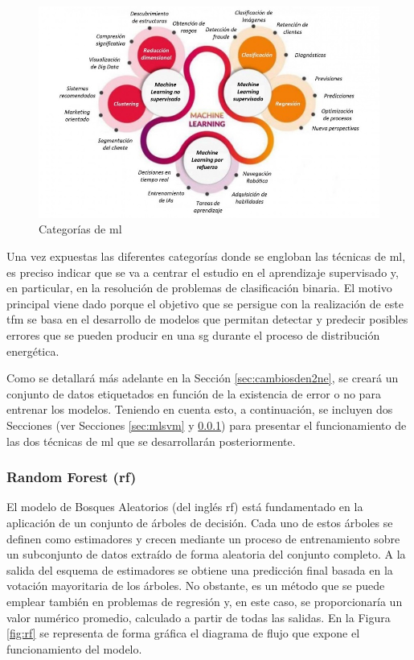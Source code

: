 \begin{figure}[h!]
    \centering
    \includegraphics[width=1\textwidth]{img/teoria/ml.jpeg}
    \caption{Categorías de \acrshort{ml} \cite{metal}}
    \label{fig:ml}
\end{figure}

\vspace{3mm}

Una vez expuestas las diferentes categorías donde se engloban las técnicas de \gls{ml}, es preciso indicar que se va a centrar el estudio en el aprendizaje supervisado y, en particular, en la resolución de problemas de clasificación binaria. El motivo principal viene dado porque el objetivo que se persigue con la realización de este \gls{tfm} se basa en el desarrollo de modelos que permitan detectar y predecir posibles errores que se pueden producir en una \gls{sg} durante el proceso de distribución energética. 

\vspace{3mm}

Como se detallará más adelante en la Sección \ref{sec:cambiosden2ne}, se creará un conjunto de datos etiquetados en función de la existencia de error o no para entrenar los modelos. Teniendo en cuenta esto, a continuación, se incluyen dos Secciones (ver Secciones \ref{sec:mlsvm} y \ref{sec:mlrf}) para presentar el funcionamiento de las dos técnicas de \gls{ml} que se desarrollarán posteriormente.

\subsubsection{Random Forest (\acrshort{rf})}
\label{sec:mlrf}

El modelo de Bosques Aleatorios (del inglés \gls{rf}) está fundamentado en la aplicación de un conjunto de árboles de decisión. Cada uno de estos árboles se definen como estimadores y crecen mediante un proceso de entrenamiento sobre un subconjunto de datos extraído de forma aleatoria del conjunto completo. A la salida del esquema de estimadores se obtiene una predicción final basada en la votación mayoritaria de los árboles. No obstante, es un método que se puede emplear también en problemas de regresión y, en este caso, se proporcionaría un valor numérico promedio, calculado a partir de todas las salidas. En la Figura \ref{fig:rf} se representa de forma gráfica el diagrama de flujo que expone el funcionamiento del modelo. \cite{rfmedium}

